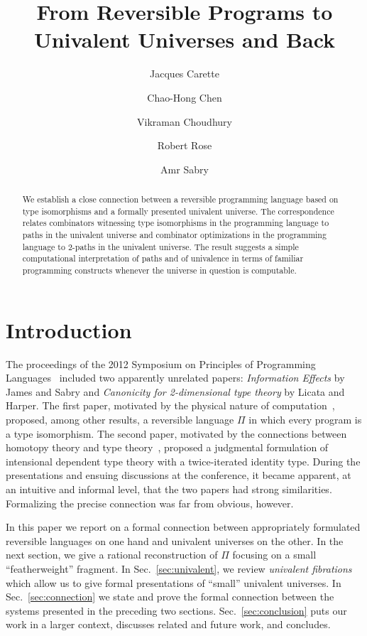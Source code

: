 \documentclass{entcs}
\begin{document}
\begin{frontmatter}
\title{From Reversible Programs to \\ Univalent Universes and Back}
\author{Jacques Carette}
\address{McMaster University}
\author{Chao-Hong Chen}
\address{Indiana University}
\author{Vikraman Choudhury}
\author{Robert Rose}
\author{Amr Sabry}
\address{Indiana University}

\begin{abstract}
  We establish a close connection between a reversible programming language
  based on type isomorphisms and a formally presented univalent universe. The
  correspondence relates combinators witnessing type isomorphisms in the
  programming language to paths in the univalent universe and combinator
  optimizations in the programming language to 2-paths in the univalent
  universe. The result suggests a simple computational interpretation of paths
  and of univalence in terms of familiar programming constructs whenever the
  universe in question is computable.
\end{abstract}

\end{frontmatter}

\section{Introduction}

The proceedings of the 2012 Symposium on Principles of Programming
Languages~\cite{Field:2012:2103656} included two apparently unrelated papers:
\emph{Information Effects} by James and Sabry and \emph{Canonicity for
  2-dimensional type theory} by Licata and Harper. The first paper, motivated by
the physical nature of
computation~\cite{Landauer:1961,PhysRevA.32.3266,Toffoli:1980,bennett1985fundamental,Frank:1999:REC:930275},
proposed, among other results, a reversible language $\Pi$ in which every
program is a type isomorphism. The second paper, motivated by the connections
between homotopy theory and type theory~\cite{vv06,hottbook}, proposed a
judgmental formulation of intensional dependent type theory with a
twice-iterated identity type. During the presentations and ensuing discussions
at the conference, it became apparent, at an intuitive and informal level, that
the two papers had strong similarities. Formalizing the precise connection was
far from obvious, however.

In this paper we report on a formal connection between appropriately formulated
reversible languages on one hand and univalent universes on the other. In the
next section, we give a rational reconstruction of $\Pi$ focusing on a small
``featherweight'' fragment. In Sec.~\ref{sec:univalent}, we review
\emph{univalent fibrations} which allow us to give formal presentations of
``small'' univalent universes. In Sec.~\ref{sec:connection} we state and prove
the formal connection between the systems presented in the preceding two
sections. Sec.~\ref{sec:conclusion} puts our work in a larger context, discusses
related and future work, and concludes.
\end{document}
